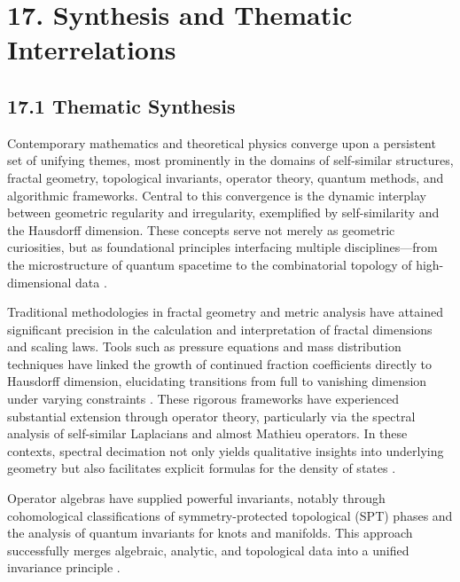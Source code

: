 \documentclass[11pt]{article}
\begin{document}
\section{17. Synthesis and Thematic Interrelations}

\subsection{17.1 Thematic Synthesis}

Contemporary mathematics and theoretical physics converge upon a persistent set of unifying themes, most prominently in the domains of self-similar structures, fractal geometry, topological invariants, operator theory, quantum methods, and algorithmic frameworks. Central to this convergence is the dynamic interplay between geometric regularity and irregularity, exemplified by self-similarity and the Hausdorff dimension. These concepts serve not merely as geometric curiosities, but as foundational principles interfacing multiple disciplines—from the microstructure of quantum spacetime to the combinatorial topology of high-dimensional data \cite{ref5,ref7,ref8,ref10,ref11,ref19,ref20,ref22,ref24,ref25,ref26,ref30,ref35,ref36,ref37,ref38,ref39,ref40,ref51,ref54,ref55,ref56,ref57,ref58,ref59,ref60,ref61,ref62,ref63,ref64,ref65}.

Traditional methodologies in fractal geometry and metric analysis have attained significant precision in the calculation and interpretation of fractal dimensions and scaling laws. Tools such as pressure equations and mass distribution techniques have linked the growth of continued fraction coefficients directly to Hausdorff dimension, elucidating transitions from full to vanishing dimension under varying constraints \cite{ref24}. These rigorous frameworks have experienced substantial extension through operator theory, particularly via the spectral analysis of self-similar Laplacians and almost Mathieu operators. In these contexts, spectral decimation not only yields qualitative insights into underlying geometry but also facilitates explicit formulas for the density of states \cite{ref25}. 

Operator algebras have supplied powerful invariants, notably through cohomological classifications of symmetry-protected topological (SPT) phases and the analysis of quantum invariants for knots and manifolds. This approach successfully merges algebraic, analytic, and topological data into a unified invariance principle \cite{ref26,ref56}.
\end{document}
